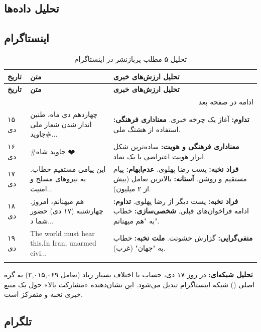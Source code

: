 \documentclass{article}
\begin{document}
	\subsection{تحلیل داده‌ها}
	
	\subsection{اینستاگرام}
	
	\begin{longtable}[c]{|p{1.5cm}|p{5cm}|p{7cm}|}
		\hline
		\textbf{تاریخ} & \textbf{متن} & \textbf{تحلیل ارزش‌های خبری} \\
		\hline
		\endfirsthead
		
		\hline
		\textbf{تاریخ} & \textbf{متن} & \textbf{تحلیل ارزش‌های خبری} \\
		\hline
		\endhead
		
		\hline \multicolumn{3}{r}{{ادامه در صفحه بعد}} \\
		\endfoot
		
		\hline
		\endlastfoot
		
		۱۵ دی & چهاردهم دی ماه، طنین انداز شدن شعار ملی \#جاوید... & \textbf{تداوم:} آغاز یک چرخه خبری. \textbf{معناداری فرهنگی:} استفاده از هشتگ ملی. \\
		\hline
		۱۶ دی & \#جاوید شاه ❤️ & \textbf{معناداری فرهنگی و هویت:} ساده‌ترین شکل ابراز هویت اعتراضی با یک نماد. \\
		\hline
		۱۷ دی & .این پیامی مستقیم خطاب به نیروهای مسلح و امنیت... & \textbf{فراد نخبه:} پست رضا پهلوی. \textbf{عدم‌ابهام:} پیام مستقیم و روشن. \textbf{آستانه:} بالاترین تعامل (بیش از ۲ میلیون). \\
		\hline
		۱۸ دی & .هم میهنانم، امروز چهارشنبه (۱۷ دی) حضور شما د... & \textbf{فراد نخبه:} پست دیگر از رضا پهلوی. \textbf{تداوم:} ادامه فراخوان‌های قبلی. \textbf{شخصی‌سازی:} خطاب به "هم میهنانم". \\
		\hline
		۱۹ دی & The world must hear this.In Iran, unarmed civi... & \textbf{منفی‌گرایی:} گزارش خشونت. \textbf{ملت نخبه:} خطاب به "جهان" (غرب). \\
		\hline
		\caption{تحلیل ۵ مطلب پربازنشر در اینستاگرام}
	\end{longtable}
	
	\textbf{تحلیل شبکه‌ای:} در روز ۱۷ دی، حساب  با اختلاف بسیار زیاد (تعامل ۲,۰۱۵,۰۶۹) به گره اصلی () شبکه اینستاگرام تبدیل می‌شود. این نشان‌دهنده «مشارکت بالا» حول یک منبع خبری نخبه و متمرکز است.
	
	\subsection{تلگرام}
	
\end{document}
